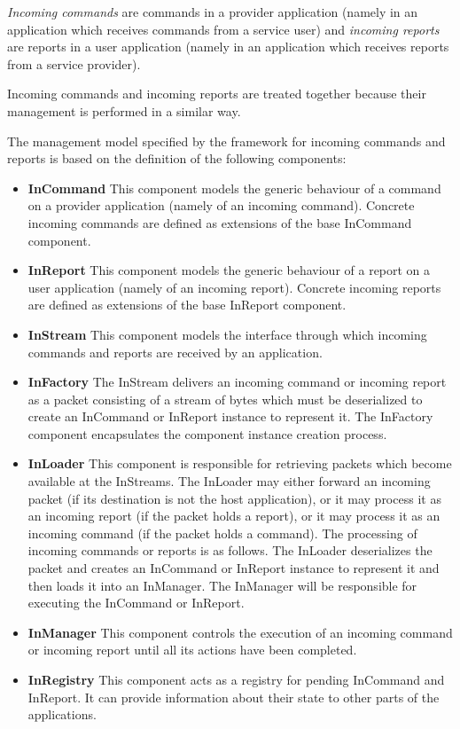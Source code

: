 \textit{Incoming commands} are commands in a provider application (namely in an application which receives commands from a service user) and \textit{incoming reports} are reports in a user application (namely in an application which receives reports from a service provider).

Incoming commands and incoming reports are treated together because their management is performed in a similar way. 

The management model specified by the framework for incoming commands and reports is based on the definition of the following components:
\begin{itemize}
\item \textbf{InCommand} 
This component models the generic behaviour of a command on a provider application (namely of an incoming command). Concrete incoming commands are defined as extensions of the base InCommand component.
\item \textbf{InReport}
This component models the generic behaviour of a report on a user application (namely of an incoming report). Concrete incoming reports are defined as extensions of the base InReport component.
\item \textbf{InStream}
This component models the interface through which incoming commands and reports are received by an application. 
\item \textbf{InFactory}
The InStream delivers an incoming command or incoming report as a packet consisting of a stream of bytes which must be deserialized to create an InCommand or InReport instance to represent it. The InFactory component encapsulates the component instance creation process.
\item \textbf{InLoader}
This component is responsible for retrieving packets which become available at the InStreams. The InLoader may either forward an incoming packet (if its destination is not the host application), or it may process it as an incoming report (if the packet holds a report), or it may process it as an incoming command (if the packet holds a command). The processing of incoming commands or reports is as follows. The InLoader deserializes the packet and creates an InCommand or InReport instance to represent it and then loads it into an InManager. The InManager will be responsible for executing the InCommand or InReport.
\item \textbf{InManager}
This component controls the execution of an incoming command or incoming report until all its actions have been completed.
\item \textbf{InRegistry}
This component acts as a registry for pending InCommand and InReport. It can provide information about their state to other parts of the applications.  
\end{itemize}

